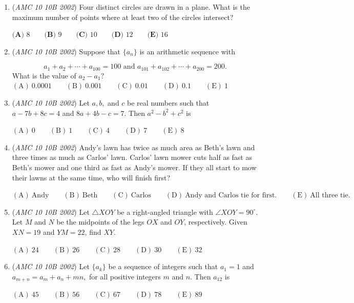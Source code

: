 \begin{enumerate}
	\item (\textit{AMC 10 10B 2002}) Four distinct circles are drawn in a plane. What is the maximum number of points where at least two of the circles intersect?


 $\textbf{(A) } 8\qquad \textbf{(B) } 9\qquad \textbf{(C) } 10\qquad \textbf{(D) } 12\qquad \textbf{(E) } 16$


	\item (\textit{AMC 10 10B 2002}) Suppose that $\{a_n\}$ is an arithmetic sequence with

 \[a_1+a_2+\cdots+a_{100}=100 \text{ and } a_{101}+a_{102}+\cdots+a_{200}=200.\]
What is the value of $a_2 - a_1 ?$
$\mathrm{(A) \ } 0.0001\qquad \mathrm{(B) \ } 0.001\qquad \mathrm{(C) \ } 0.01\qquad \mathrm{(D) \ } 0.1\qquad \mathrm{(E) \ } 1$


	\item (\textit{AMC 10 10B 2002}) Let $a, b,$ and $c$ be real numbers such that $a-7b+8c=4$ and $8a+4b-c=7.$ Then $a^2-b^2+c^2$ is


 $\mathrm{(A) \ } 0\qquad \mathrm{(B) \ } 1\qquad \mathrm{(C) \ } 4\qquad \mathrm{(D) \ } 7\qquad \mathrm{(E) \ } 8$


	\item (\textit{AMC 10 10B 2002}) Andy's lawn has twice as much area as Beth's lawn and three times as much as Carlos' lawn. Carlos' lawn mower cuts half as fast as Beth's mower and one third as fast as Andy's mower. If they all start to mow their lawns at the same time, who will finish first?


 $\mathrm{(A) \ } \text{Andy}\qquad \mathrm{(B) \ } \text{Beth}\qquad \mathrm{(C) \ } \text{Carlos}\qquad \mathrm{(D) \ } \text{Andy and Carlos tie for first.}\qquad \mathrm{(E) \ } \text{All three tie.}$


	\item (\textit{AMC 10 10B 2002}) Let $\triangle{XOY}$ be a right-angled triangle with $\angle{XOY}=90^\circ$. Let $M$ and $N$ be the midpoints of the legs $OX$ and $OY$, respectively. Given $XN=19$ and $YM=22$, find $XY$.


 $\mathrm{(A) \ } 24\qquad \mathrm{(B) \ } 26\qquad \mathrm{(C) \ } 28\qquad \mathrm{(D) \ } 30\qquad \mathrm{(E) \ } 32$


	\item (\textit{AMC 10 10B 2002}) Let $\{a_k\}$ be a sequence of integers such that $a_1=1$ and $a_{m+n}=a_m+a_n+mn,$ for all positive integers $m$ and $n.$ Then $a_{12}$ is


 $\mathrm{(A) \ } 45\qquad \mathrm{(B) \ } 56\qquad \mathrm{(C) \ } 67\qquad \mathrm{(D) \ } 78\qquad \mathrm{(E) \ } 89$



\end{enumerate}
